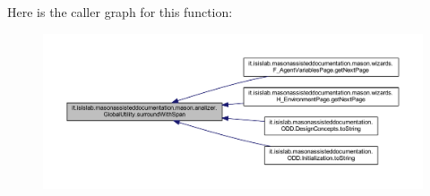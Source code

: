 Here is the caller graph for this function\-:\nopagebreak
\begin{figure}[H]
\begin{center}
\leavevmode
\includegraphics[width=350pt]{classit_1_1isislab_1_1masonassisteddocumentation_1_1mason_1_1analizer_1_1_global_utility_a34ef4730213af90fec963a5b86f992b4_icgraph}
\end{center}
\end{figure}




